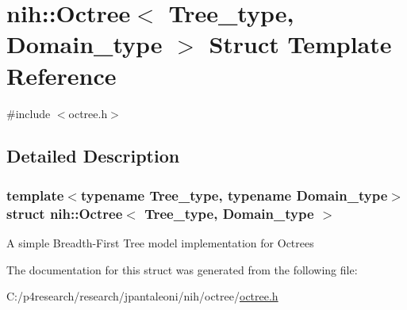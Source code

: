 \hypertarget{structnih_1_1_octree}{
\section{nih\-:\-:\-Octree$<$ \-Tree\-\_\-type, \-Domain\-\_\-type $>$ \-Struct \-Template \-Reference}
\label{structnih_1_1_octree}
}


{\ttfamily \#include $<$octree.\-h$>$}



\subsection{\-Detailed \-Description}
\subsubsection*{template$<$typename Tree\-\_\-type, typename Domain\-\_\-type$>$struct nih\-::\-Octree$<$ Tree\-\_\-type, Domain\-\_\-type $>$}

\-A simple \-Breadth-\/\-First \-Tree model implementation for \-Octrees 

\-The documentation for this struct was generated from the following file\-:\begin{DoxyCompactItemize}
\item 
\-C\-:/p4research/research/jpantaleoni/nih/octree/\hyperlink{octree_8h}{octree.\-h}\end{DoxyCompactItemize}
